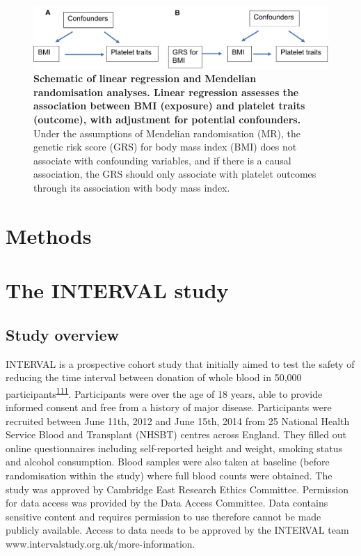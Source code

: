 \documentclass[11pt,twoside]{bristolthesis}
\begin{document}
\begin{figure}

{\centering \includegraphics[width=0.8\linewidth]{figure/BMI_platelets/obsvMRexample} 

}

\caption[Schematic of linear regression and Mendelian randomisation frameworks for BMI and platelet trait analyses]{\textbf{Schematic of linear regression and Mendelian randomisation analyses. Linear regression assesses the association between BMI (exposure) and platelet traits (outcome), with adjustment for potential confounders.} Under the assumptions of Mendelian randomisation (MR), the genetic risk score (GRS) for body mass index (BMI) does not associate with confounding variables, and if there is a causal association, the GRS should only associate with platelet outcomes through its association with body mass index.}\label{fig:Linear-reg-MR}
\end{figure}
\hypertarget{methods}{%
\section{Methods}\label{methods}}

\hypertarget{INTERVAL-study}{%
\section{The INTERVAL study}\label{INTERVAL-study}}

\hypertarget{study-overview}{%
\subsection{Study overview}\label{study-overview}}

INTERVAL is a prospective cohort study that initially aimed to test the safety of reducing the time interval between donation of whole blood in 50,000 participants\textsuperscript{\protect\hyperlink{ref-DiAngelantonio2017}{111}}. Participants were over the age of 18 years, able to provide informed consent and free from a history of major disease. Participants were recruited between June 11th, 2012 and June 15th, 2014 from 25 National Health Service Blood and Transplant (NHSBT) centres across England. They filled out online questionnaires including self-reported height and weight, smoking status and alcohol consumption. Blood samples were also taken at baseline (before randomisation within the study) where full blood counts were obtained. The study was approved by Cambridge East Research Ethics Committee. Permission for data access was provided by the Data Access Committee. Data contains sensitive content and requires permission to use therefore cannot be made publicly available. Access to data needs to be approved by the INTERVAL team www.intervalstudy.org.uk/more-information.
\end{document}
